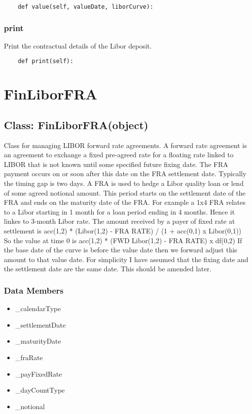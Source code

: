 \documentclass[twoside,11pt]{book}
\begin{document}
\begin{lstlisting}
    def value(self, valueDate, liborCurve):
\end{lstlisting}

\subsubsection*{{\bf print}}
Print the contractual details of the Libor deposit.  

\begin{lstlisting}
    def print(self):
\end{lstlisting}

\newpage
\section{FinLiborFRA}

\subsection*{Class: FinLiborFRA(object)}
Class for managing LIBOR forward rate agreements. A forward rate agreement is an agreement to exchange a fixed pre-agreed rate for a floating rate linked to LIBOR that is not known until some specified future fixing date. The FRA payment occurs on or soon after this date on the FRA settlement date. Typically the timing gap is two days.  A FRA is used to hedge a Libor quality loan or lend of some agreed notional amount. This period starts on the settlement date of the FRA and ends on the maturity date of the FRA. For example a 1x4 FRA relates to a Libor starting in 1 month for a loan period ending in 4 months. Hence it linkes to 3-month Libor rate.  The amount received by a payer of fixed rate at settlement is  acc(1,2) * (Libor(1,2) - FRA RATE) / (1 + acc(0,1) x Libor(0,1))  So the value at time 0 is  acc(1,2) * (FWD Libor(1,2) - FRA RATE) x df(0,2)  If the base date of the curve is before the value date then we forward adjust this amount to that value date.  For simplicity I have assumed that the fixing date and the settlement date are the same date. This should be amended later.  

\subsubsection*{Data Members}
\begin{itemize}
\item{\_calendarType}
\item{\_settlementDate}
\item{\_maturityDate}
\item{\_fraRate}
\item{\_payFixedRate}
\item{\_dayCountType}
\item{\_notional}
\end{itemize}
\end{document}
